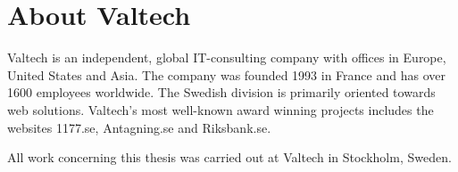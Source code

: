 \section{About Valtech}
Valtech is an independent, global IT-consulting company with offices in Europe, United States and Asia. The company was founded 1993 in France and has over 1600 employees worldwide. The Swedish division is primarily oriented towards web solutions. Valtech’s most well-known award winning projects includes the websites 1177.se, Antagning.se and Riksbank.se.

All work concerning this thesis was carried out at Valtech in Stockholm, Sweden.
